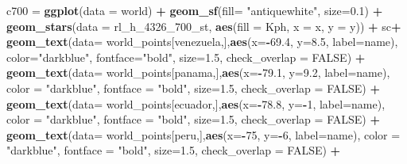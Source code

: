 \documentclass[12pt,twoside]{reedthesis}
\newenvironment{Shaded}{\begin{snugshade}}{\end{snugshade}}
\newcommand{\DataTypeTok}[1]{\textcolor[rgb]{0.13,0.29,0.53}{#1}}
\newcommand{\DecValTok}[1]{\textcolor[rgb]{0.00,0.00,0.81}{#1}}
\newcommand{\FloatTok}[1]{\textcolor[rgb]{0.00,0.00,0.81}{#1}}
\newcommand{\KeywordTok}[1]{\textcolor[rgb]{0.13,0.29,0.53}{\textbf{#1}}}
\newcommand{\NormalTok}[1]{#1}
\newcommand{\OperatorTok}[1]{\textcolor[rgb]{0.81,0.36,0.00}{\textbf{#1}}}
\newcommand{\OtherTok}[1]{\textcolor[rgb]{0.56,0.35,0.01}{#1}}
\newcommand{\StringTok}[1]{\textcolor[rgb]{0.31,0.60,0.02}{#1}}
\begin{document}
\begin{Shaded}
\begin{Highlighting}[]
\NormalTok{c700 =}\StringTok{ }\KeywordTok{ggplot}\NormalTok{(}\DataTypeTok{data =}\NormalTok{ world) }\OperatorTok{+}\StringTok{ }
\StringTok{  }\KeywordTok{geom_sf}\NormalTok{(}\DataTypeTok{fill=} \StringTok{"antiquewhite"}\NormalTok{, }\DataTypeTok{size=}\FloatTok{0.1}\NormalTok{) }\OperatorTok{+}\StringTok{ }
\StringTok{  }\KeywordTok{geom_stars}\NormalTok{(}\DataTypeTok{data =}\NormalTok{ rl_h_}\DecValTok{4326}\NormalTok{_}\DecValTok{700}\NormalTok{_st, }\KeywordTok{aes}\NormalTok{(}\DataTypeTok{fill =}\NormalTok{ Kph, }\DataTypeTok{x =}\NormalTok{ x, }\DataTypeTok{y =}\NormalTok{ y)) }\OperatorTok{+}\StringTok{ }
\StringTok{  }\NormalTok{sc}\OperatorTok{+}
\StringTok{  }\KeywordTok{geom_text}\NormalTok{(}\DataTypeTok{data=}\NormalTok{ world_points[venezuela,],}\KeywordTok{aes}\NormalTok{(}\DataTypeTok{x=}\OperatorTok{-}\FloatTok{69.4}\NormalTok{, }\DataTypeTok{y=}\FloatTok{8.5}\NormalTok{, }\DataTypeTok{label=}\NormalTok{name), }\DataTypeTok{color=}\StringTok{"darkblue"}\NormalTok{, }\DataTypeTok{fontface=}\StringTok{"bold"}\NormalTok{, }\DataTypeTok{size=}\FloatTok{1.5}\NormalTok{, }\DataTypeTok{check_overlap =} \OtherTok{FALSE}\NormalTok{) }\OperatorTok{+}
\StringTok{  }\KeywordTok{geom_text}\NormalTok{(}\DataTypeTok{data=}\NormalTok{ world_points[panama,],}\KeywordTok{aes}\NormalTok{(}\DataTypeTok{x=}\OperatorTok{-}\FloatTok{79.1}\NormalTok{, }\DataTypeTok{y=}\FloatTok{9.2}\NormalTok{, }\DataTypeTok{label=}\NormalTok{name), }\DataTypeTok{color =} \StringTok{"darkblue"}\NormalTok{, }\DataTypeTok{fontface =} \StringTok{"bold"}\NormalTok{, }\DataTypeTok{size=}\FloatTok{1.5}\NormalTok{, }\DataTypeTok{check_overlap =} \OtherTok{FALSE}\NormalTok{) }\OperatorTok{+}\StringTok{ }
\StringTok{  }\KeywordTok{geom_text}\NormalTok{(}\DataTypeTok{data=}\NormalTok{ world_points[ecuador,],}\KeywordTok{aes}\NormalTok{(}\DataTypeTok{x=}\OperatorTok{-}\FloatTok{78.8}\NormalTok{, }\DataTypeTok{y=}\OperatorTok{-}\DecValTok{1}\NormalTok{, }\DataTypeTok{label=}\NormalTok{name), }\DataTypeTok{color =} \StringTok{"darkblue"}\NormalTok{, }\DataTypeTok{fontface =} \StringTok{"bold"}\NormalTok{, }\DataTypeTok{size=}\FloatTok{1.5}\NormalTok{, }\DataTypeTok{check_overlap =} \OtherTok{FALSE}\NormalTok{) }\OperatorTok{+}
\StringTok{  }\KeywordTok{geom_text}\NormalTok{(}\DataTypeTok{data=}\NormalTok{ world_points[peru,],}\KeywordTok{aes}\NormalTok{(}\DataTypeTok{x=}\OperatorTok{-}\DecValTok{75}\NormalTok{, }\DataTypeTok{y=}\OperatorTok{-}\DecValTok{6}\NormalTok{, }\DataTypeTok{label=}\NormalTok{name), }\DataTypeTok{color =} \StringTok{"darkblue"}\NormalTok{, }\DataTypeTok{fontface =} \StringTok{"bold"}\NormalTok{, }\DataTypeTok{size=}\FloatTok{1.5}\NormalTok{, }\DataTypeTok{check_overlap =} \OtherTok{FALSE}\NormalTok{) }\OperatorTok{+}

\end{Highlighting}
\end{Shaded}
\end{document}
